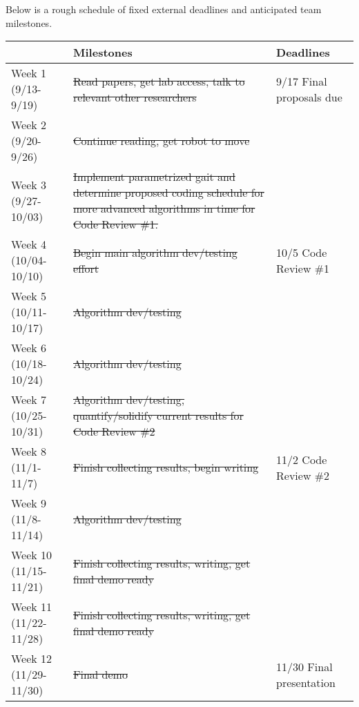 Below is a rough schedule of fixed external deadlines and anticipated
team milestones.

\newcommand{\done}[1]{{\color{doneColor}\sout{#1}}}

\begin{center}
\begin{tabular}{|l||p{2.5in}|p{1.5in}|}
\hline
                        & {\bf Milestones} & {\bf Deadlines}
\\ \hline

Week 1 (9/13-9/19)    & \done{Read papers, get lab access, talk to relevant other researchers} & 9/17 Final proposals due
\\ \hline

Week 2 (9/20-9/26)    & \done{Continue reading, get robot to move} &
\\ \hline

Week 3 (9/27-10/03)   & \done{Implement parametrized gait and determine proposed coding schedule for more advanced algorithms in time for Code Review \#1.} &
\\ \hline

Week 4 (10/04-10/10)  & \done{Begin main algorithm dev/testing effort} & 10/5 Code Review \#1
\\ \hline

Week 5 (10/11-10/17)  & \done{Algorithm dev/testing} &
\\ \hline

Week 6 (10/18-10/24)  & \done{Algorithm dev/testing} &
\\ \hline

Week 7 (10/25-10/31)  & \done{Algorithm dev/testing, quantify/solidify current results for Code Review \#2} &
\\ \hline

Week 8 (11/1-11/7)    & \done{Finish collecting results, begin writing} & 11/2 Code Review \#2
\\ \hline

Week 9 (11/8-11/14)   & \done{Algorithm dev/testing} &
\\ \hline

Week 10 (11/15-11/21) & \done{Finish collecting results, writing, get final demo ready} &
\\ \hline

Week 11 (11/22-11/28) & \done{Finish collecting results, writing, get final demo ready}  &
\\ \hline

Week 12 (11/29-11/30) & \done{Final demo}  & 11/30 Final presentation
\\ \hline
\end{tabular}
\end{center}



